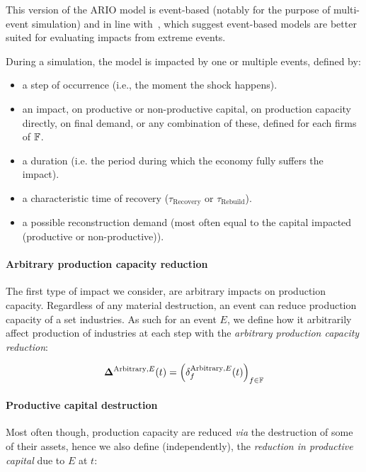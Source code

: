 \documentclass[main.tex]{subfiles}
\begin{document}
This version of the ARIO model is event-based (notably for the
purpose of multi-event simulation) and in line
with~\textcite{otto-2020-event-based}, which suggest event-based models are
better suited for evaluating impacts from extreme events.

During a simulation, the model is impacted by one or multiple events, defined by:
\begin{itemize}
\item a step of occurrence (i.e., the moment the shock happens).
\item an impact, on productive or non-productive capital, on production capacity
  directly, on final demand, or any combination of these, defined for each firms of $\mathbb{F}$.
\item a duration (i.e. the period during which the economy fully suffers the
  impact).
\item a characteristic time of recovery ($\tau_{\textrm{Recovery}}$ or $\tau_{\textrm{Rebuild}}$).
\item a possible reconstruction demand (most often equal to the capital impacted
  (productive or non-productive)).
\end{itemize}


\paragraph{Arbitrary production capacity reduction}
\label{sec:arbitr-prod-capac}

The first type of impact we consider, are arbitrary impacts on production
capacity. Regardless of any material destruction, an event can reduce production
capacity of a set industries. As such for an event $E$, we define how it
arbitrarily affect production of industries at each step with the
\emph{arbitrary production capacity reduction}:

\[
  \bm{\Delta}^{\textrm{Arbitrary},E}(t) = \left (
    \delta^{\textrm{Arbitrary},E}_f(t) \right )_{f \in \mathbb{F}}
\]

\paragraph{Productive capital destruction}
\label{sec:prod-capit-destr}

Most often though, production capacity are reduced \emph{via} the destruction of some
of their assets, hence we also define (independently), the \emph{reduction in productive
  capital} due to $E$ at $t$:
\end{document}
